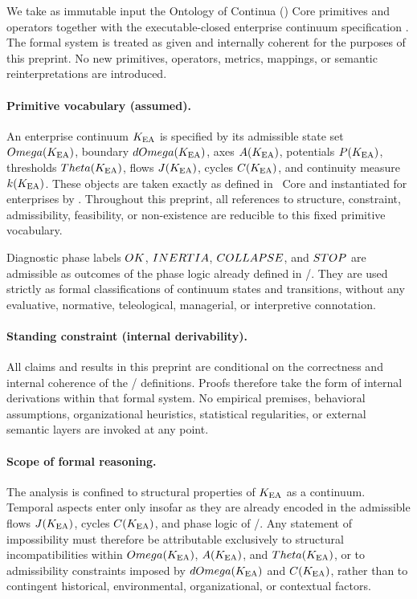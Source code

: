﻿We take as immutable input the Ontology of Continua (\OC) Core primitives and
operators together with the executable-closed enterprise continuum
specification . The formal system is treated as given and
internally coherent for the purposes of this preprint. No new primitives,
operators, metrics, mappings, or semantic reinterpretations are introduced.

\paragraph{Primitive vocabulary (assumed).}
An enterprise continuum $K_{\mathrm{EA}}$ is specified by its admissible state set
$Omega(K_{\mathrm{EA}})$, boundary $dOmega(K_{\mathrm{EA}})$, axes $A(K_{\mathrm{EA}})$, potentials $P(K_{\mathrm{EA}})$,
thresholds $Theta(K_{\mathrm{EA}})$, flows $J(K_{\mathrm{EA}})$, cycles $C(K_{\mathrm{EA}})$, and continuity
measure $k(K_{\mathrm{EA}})$. These objects are taken exactly as defined in \OC\ Core
and instantiated for enterprises by . Throughout this
preprint, all references to structure, constraint, admissibility, feasibility,
or non-existence are reducible to this fixed primitive vocabulary.

Diagnostic phase labels $OK$, $INERTIA$, $COLLAPSE$, and $STOP$ are admissible as
outcomes of the phase logic already defined in \OC/. They are used
strictly as formal classifications of continuum states and transitions, without
any evaluative, normative, teleological, managerial, or interpretive
connotation.

\paragraph{Standing constraint (internal derivability).}
All claims and results in this preprint are conditional on the correctness and
internal coherence of the \OC/ definitions. Proofs therefore take the
form of internal derivations within that formal system. No empirical premises,
behavioral assumptions, organizational heuristics, statistical regularities, or
external semantic layers are invoked at any point.

\paragraph{Scope of formal reasoning.}
The analysis is confined to structural properties of $K_{\mathrm{EA}}$ as a continuum.
Temporal aspects enter only insofar as they are already encoded in the
admissible flows $J(K_{\mathrm{EA}})$, cycles $C(K_{\mathrm{EA}})$, and phase logic of
\OC/. Any statement of impossibility must therefore be attributable
exclusively to structural incompatibilities within $Omega(K_{\mathrm{EA}})$, $A(K_{\mathrm{EA}})$,
and $Theta(K_{\mathrm{EA}})$, or to admissibility constraints imposed by $dOmega(K_{\mathrm{EA}})$ and
$C(K_{\mathrm{EA}})$, rather than to contingent historical, environmental,
organizational, or contextual factors.
